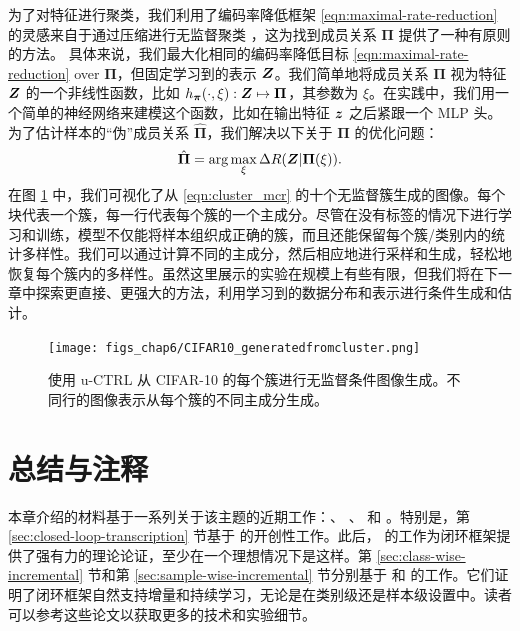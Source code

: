 \documentclass[../../book-main.tex]{subfiles}
\begin{document}
为了对特征进行聚类，我们利用了编码率降低框架 \eqref{eqn:maximal-rate-reduction} 的灵感来自于通过压缩进行无监督聚类 \cite{ma2007segmentation}，这为找到成员关系 $\bm \Pi$ 提供了一种有原则的方法。
具体来说，我们最大化相同的编码率降低目标 \eqref{eqn:maximal-rate-reduction} over $\bm \Pi$，但固定学习到的表示 $\bm{Z}$。我们简单地将成员关系 $\bm \Pi$ 视为特征 $\bm{Z}$ 的一个非线性函数，比如 $h_{\bm \pi}(\cdot,\xi):\bm{Z} \mapsto \bm \Pi$，其参数为 $\xi$。在实践中，我们用一个简单的神经网络来建模这个函数，比如在输出特征 $\bm{z}$ 之后紧跟一个 MLP 头。
为了估计样本的“伪”成员关系 $\hat{\bm \Pi}$，我们解决以下关于 $\bm \Pi$ 的优化问题：
\begin{align}
    \hat{\bm \Pi} = \arg\max_{\xi} \Delta R(\bm{Z}| \bm \Pi(\xi)).
\label{eqn:cluster_mcr}
\end{align}
在图 \ref{fig:vis_clustering} 中，我们可视化了从 \eqref{eqn:cluster_mcr} 的十个无监督簇生成的图像。每个块代表一个簇，每一行代表每个簇的一个主成分。尽管在没有标签的情况下进行学习和训练，模型不仅能将样本组织成正确的簇，而且还能保留每个簇/类别内的统计多样性。我们可以通过计算不同的主成分，然后相应地进行采样和生成，轻松地恢复每个簇内的多样性。虽然这里展示的实验在规模上有些有限，但我们将在下一章中探索更直接、更强大的方法，利用学习到的数据分布和表示进行条件生成和估计。
\begin{figure}[t]
    \footnotesize
    \centering
    \texttt{[image: figs\_chap6/CIFAR10\_generatedfromcluster.png]}
    \caption{\small 使用 u-CTRL 从 CIFAR-10 的每个簇进行无监督条件图像生成。不同行的图像表示从每个簇的不同主成分生成。}
    \label{fig:vis_clustering}
\end{figure}





\section{总结与注释}
本章介绍的材料基于一系列关于该主题的近期工作：\cite{Dai-entropy-2022}、
\cite{pai2022pursuit}、\cite{tong2023incremental} 和 \cite{pmlr-v234-tong24a}。特别是，第 \ref{sec:closed-loop-transcription} 节基于 \cite{Dai-entropy-2022} 的开创性工作。此后，\cite{pai2022pursuit} 的工作为闭环框架提供了强有力的理论论证，至少在一个理想情况下是这样。第 \ref{sec:class-wise-incremental} 节和第 \ref{sec:sample-wise-incremental} 节分别基于 \cite{tong2023incremental} 和 \cite{pmlr-v234-tong24a} 的工作。它们证明了闭环框架自然支持增量和持续学习，无论是在类别级还是样本级设置中。读者可以参考这些论文以获取更多的技术和实验细节。
\end{document}
